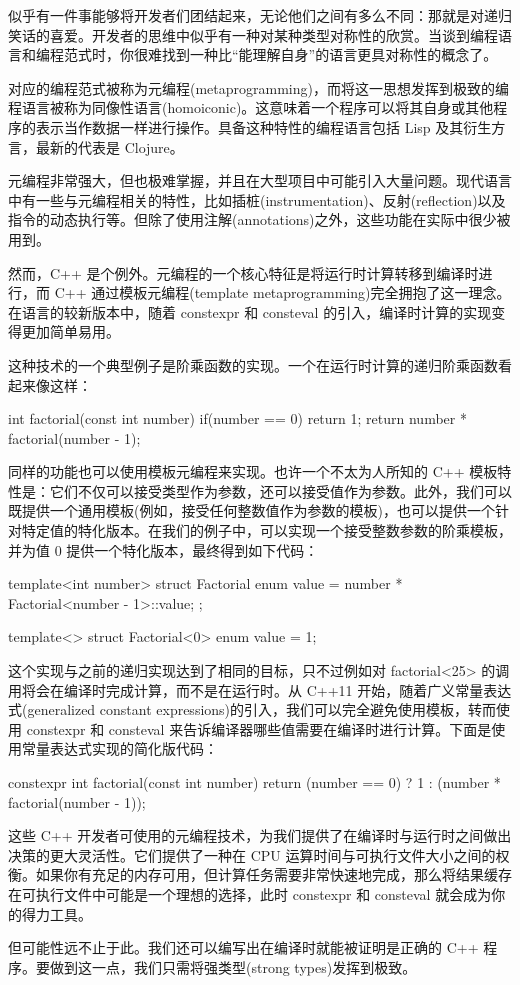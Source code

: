 
似乎有一件事能够将开发者们团结起来，无论他们之间有多么不同：那就是对递归笑话的喜爱。开发者的思维中似乎有一种对某种类型对称性的欣赏。当谈到编程语言和编程范式时，你很难找到一种比“能理解自身”的语言更具对称性的概念了。

对应的编程范式被称为元编程(metaprogramming)，而将这一思想发挥到极致的编程语言被称为同像性语言(homoiconic)。这意味着一个程序可以将其自身或其他程序的表示当作数据一样进行操作。具备这种特性的编程语言包括 Lisp 及其衍生方言，最新的代表是 Clojure。

元编程非常强大，但也极难掌握，并且在大型项目中可能引入大量问题。现代语言中有一些与元编程相关的特性，比如插桩(instrumentation)、反射(reflection)以及指令的动态执行等。但除了使用注解(annotations)之外，这些功能在实际中很少被用到。

然而，C++ 是个例外。元编程的一个核心特征是将运行时计算转移到编译时进行，而 C++ 通过模板元编程(template metaprogramming)完全拥抱了这一理念。在语言的较新版本中，随着 constexpr 和 consteval 的引入，编译时计算的实现变得更加简单易用。

这种技术的一个典型例子是阶乘函数的实现。一个在运行时计算的递归阶乘函数看起来像这样：

\begin{cpp}
int factorial(const int number){
  if(number == 0) return 1;
  return number * factorial(number - 1);
}
\end{cpp}

同样的功能也可以使用模板元编程来实现。也许一个不太为人所知的 C++ 模板特性是：它们不仅可以接受类型作为参数，还可以接受值作为参数。此外，我们可以既提供一个通用模板(例如，接受任何整数值作为参数的模板)，也可以提供一个针对特定值的特化版本。在我们的例子中，可以实现一个接受整数参数的阶乘模板，并为值 0 提供一个特化版本，最终得到如下代码：

\begin{cpp}
template<int number>
struct Factorial {
  enum { value = number * Factorial<number - 1>::value};
};

template<>
struct Factorial<0>{
  enum {value = 1};
}
\end{cpp}

这个实现与之前的递归实现达到了相同的目标，只不过例如对 factorial<25> 的调用将会在编译时完成计算，而不是在运行时。从 C++11 开始，随着广义常量表达式(generalized constant expressions)的引入，我们可以完全避免使用模板，转而使用 constexpr 和 consteval 来告诉编译器哪些值需要在编译时进行计算。下面是使用常量表达式实现的简化版代码：

\begin{cpp}
constexpr int factorial(const int number) {
  return (number == 0) ? 1 : (number * factorial(number - 1));
}
\end{cpp}

这些 C++ 开发者可使用的元编程技术，为我们提供了在编译时与运行时之间做出决策的更大灵活性。它们提供了一种在 CPU 运算时间与可执行文件大小之间的权衡。如果你有充足的内存可用，但计算任务需要非常快速地完成，那么将结果缓存在可执行文件中可能是一个理想的选择，此时 constexpr 和 consteval 就会成为你的得力工具。

但可能性远不止于此。我们还可以编写出在编译时就能被证明是正确的 C++ 程序。要做到这一点，我们只需将强类型(strong types)发挥到极致。




